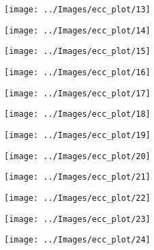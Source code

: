\begin{figure}[!htbp]

  \begin{minipage}{0.3\textwidth} \centering
    \texttt{[image: ../Images/ecc\_plot/13]}
  \end{minipage}
  \begin{minipage}{0.3\textwidth} \centering
    \texttt{[image: ../Images/ecc\_plot/14]}
  \end{minipage}
  \begin{minipage}{0.3\textwidth} \centering
    \texttt{[image: ../Images/ecc\_plot/15]}
  \end{minipage}
\end{figure}

\begin{figure}[!htbp]

  \begin{minipage}{0.3\textwidth} \centering
    \texttt{[image: ../Images/ecc\_plot/16]}
  \end{minipage}
  \begin{minipage}{0.3\textwidth} \centering
    \texttt{[image: ../Images/ecc\_plot/17]}
  \end{minipage}
  \begin{minipage}{0.3\textwidth} \centering
    \texttt{[image: ../Images/ecc\_plot/18]}
  \end{minipage}
\end{figure}

\begin{figure}[!htbp]

  \begin{minipage}{0.3\textwidth} \centering
    \texttt{[image: ../Images/ecc\_plot/19]}
  \end{minipage}
  \begin{minipage}{0.3\textwidth} \centering
    \texttt{[image: ../Images/ecc\_plot/20]}
  \end{minipage}
  \begin{minipage}{0.3\textwidth} \centering
    \texttt{[image: ../Images/ecc\_plot/21]}
  \end{minipage}
\end{figure}

\begin{figure}[!htbp]

  \begin{minipage}{0.3\textwidth} \centering
    \texttt{[image: ../Images/ecc\_plot/22]}
  \end{minipage}
  \begin{minipage}{0.3\textwidth} \centering
    \texttt{[image: ../Images/ecc\_plot/23]}
  \end{minipage}
  \begin{minipage}{0.3\textwidth} \centering
    \texttt{[image: ../Images/ecc\_plot/24]}
  \end{minipage}
\end{figure}

